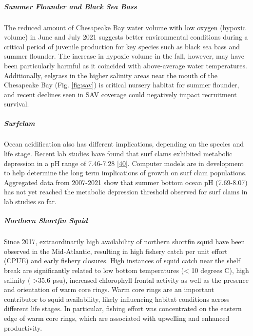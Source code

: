 \documentclass[
  10pt,
]{article}
\begin{document}
\hypertarget{summer-flounder-and-black-sea-bass}{%
\subparagraph{\texorpdfstring{\emph{Summer Flounder and Black Sea
Bass}}{Summer Flounder and Black Sea Bass}}\label{summer-flounder-and-black-sea-bass}}

The reduced amount of Chesapeake Bay water volume with low oxygen
(hypoxic volume) in June and July 2021 suggests better environmental
conditions during a critical period of juvenile production for key
species such as black sea bass and summer flounder. The increase in
hypoxic volume in the fall, however, may have been particularly harmful
as it coincided with above-average water temperatures. Additionally,
eelgrass in the higher salinity areas near the mouth of the Chesapeake
Bay (Fig. \ref{fig:sav}) is critical nursery habitat for summer
flounder, and recent declines seen in SAV coverage could negatively
impact recruitment survival.

\hypertarget{surfclam}{%
\subparagraph{\texorpdfstring{\emph{Surfclam}}{Surfclam}}\label{surfclam}}

Ocean acidification also has different implications, depending on the
species and life stage. Recent lab studies have found that surf clams
exhibited metabolic depression in a pH range of 7.46-7.28
{[}\protect\hyperlink{ref-pousse_energetic_2020}{40}{]}. Computer models
are in development to help determine the long term implications of
growth on surf clam populations. Aggregated data from 2007-2021 show
that summer bottom ocean pH (7.69-8.07) has not yet reached the
metabolic depression threshold observed for surf clams in lab studies so
far.

\hypertarget{northern-shortfin-squid}{%
\subparagraph{\texorpdfstring{\emph{Northern Shortfin
Squid}}{Northern Shortfin Squid}}\label{northern-shortfin-squid}}

Since 2017, extraordinarily high availability of northern shortfin squid
have been observed in the Mid-Atlantic, resulting in high fishery catch
per unit effort (CPUE) and early fishery closures. High instances of
squid catch near the shelf break are significantly related to low bottom
temperatures (\textless{} 10 degrees C), high salinity (
\textgreater35.6 psu), increased chlorophyll frontal activity as well as
the presence and orientation of warm core rings. Warm core rings are an
important contributor to squid availability, likely influencing habitat
conditions across different life stages. In particular, fishing effort
was concentrated on the eastern edge of warm core rings, which are
associated with upwelling and enhanced productivity.
\end{document}
